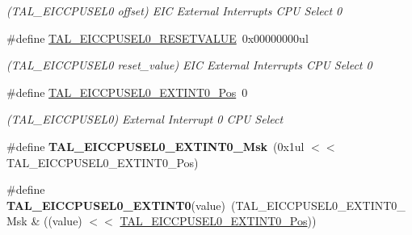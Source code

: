\begin{DoxyCompactItemize}
\begin{DoxyCompactList}\small\item\em (T\+A\+L\+\_\+\+E\+I\+C\+C\+P\+U\+S\+E\+L0 offset) E\+I\+C External Interrupts C\+P\+U Select 0 \end{DoxyCompactList}\item 
\hypertarget{group___s_a_m_l21___t_a_l_gacf0367f1b6814f9e2a054d7a385ee83b}{}\#define \hyperlink{group___s_a_m_l21___t_a_l_gacf0367f1b6814f9e2a054d7a385ee83b}{T\+A\+L\+\_\+\+E\+I\+C\+C\+P\+U\+S\+E\+L0\+\_\+\+R\+E\+S\+E\+T\+V\+A\+L\+U\+E}~0x00000000ul\label{group___s_a_m_l21___t_a_l_gacf0367f1b6814f9e2a054d7a385ee83b}

\begin{DoxyCompactList}\small\item\em (T\+A\+L\+\_\+\+E\+I\+C\+C\+P\+U\+S\+E\+L0 reset\+\_\+value) E\+I\+C External Interrupts C\+P\+U Select 0 \end{DoxyCompactList}\item 
\hypertarget{group___s_a_m_l21___t_a_l_gab485ed3f050adcd39b05d925097f5c96}{}\#define \hyperlink{group___s_a_m_l21___t_a_l_gab485ed3f050adcd39b05d925097f5c96}{T\+A\+L\+\_\+\+E\+I\+C\+C\+P\+U\+S\+E\+L0\+\_\+\+E\+X\+T\+I\+N\+T0\+\_\+\+Pos}~0\label{group___s_a_m_l21___t_a_l_gab485ed3f050adcd39b05d925097f5c96}

\begin{DoxyCompactList}\small\item\em (T\+A\+L\+\_\+\+E\+I\+C\+C\+P\+U\+S\+E\+L0) External Interrupt 0 C\+P\+U Select \end{DoxyCompactList}\item 
\hypertarget{group___s_a_m_l21___t_a_l_ga32eecd337c215691374aadcdf717d637}{}\#define {\bfseries T\+A\+L\+\_\+\+E\+I\+C\+C\+P\+U\+S\+E\+L0\+\_\+\+E\+X\+T\+I\+N\+T0\+\_\+\+Msk}~(0x1ul $<$$<$ T\+A\+L\+\_\+\+E\+I\+C\+C\+P\+U\+S\+E\+L0\+\_\+\+E\+X\+T\+I\+N\+T0\+\_\+\+Pos)\label{group___s_a_m_l21___t_a_l_ga32eecd337c215691374aadcdf717d637}

\item 
\hypertarget{group___s_a_m_l21___t_a_l_ga1f041622699f0fb01d9fbc76b393dd15}{}\#define {\bfseries T\+A\+L\+\_\+\+E\+I\+C\+C\+P\+U\+S\+E\+L0\+\_\+\+E\+X\+T\+I\+N\+T0}(value)~(T\+A\+L\+\_\+\+E\+I\+C\+C\+P\+U\+S\+E\+L0\+\_\+\+E\+X\+T\+I\+N\+T0\+\_\+\+Msk \& ((value) $<$$<$ \hyperlink{group___s_a_m_l21___t_a_l_gab485ed3f050adcd39b05d925097f5c96}{T\+A\+L\+\_\+\+E\+I\+C\+C\+P\+U\+S\+E\+L0\+\_\+\+E\+X\+T\+I\+N\+T0\+\_\+\+Pos}))\label{group___s_a_m_l21___t_a_l_ga1f041622699f0fb01d9fbc76b393dd15}


\end{DoxyCompactItemize}
